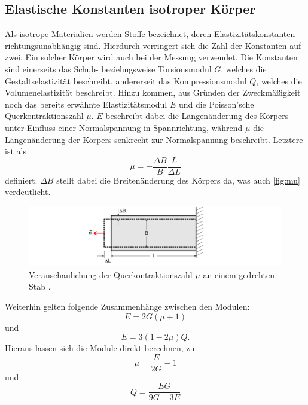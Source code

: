     \subsection{Elastische Konstanten isotroper Körper}
    \label{sec:konstanten}
    Als isotrope Materialien werden Stoffe bezeichnet, deren Elastizitätskonstanten richtungsunabhängig sind. Hierdurch verringert
    sich die Zahl der Konstanten auf zwei. Ein solcher Körper wird auch bei der Messung verwendet.
    Die Konstanten sind einerseits das Schub- beziehugsweise Torsionsmodul $G$, welches die Gestaltselastizität beschreibt, 
    andererseit das Kompressionsmodul $Q$, welches die Volumenelastizität beschreibt. Hinzu kommen, aus Gründen der Zweckmäßigkeit
    noch das bereits erwähnte Elastizitätsmodul $E$ und die Poisson'sche Querkontraktionszahl $\mu$.
    $E$ beschreibt dabei die Längenänderung des Körpers unter Einfluss einer Normalspannung in Spannrichtung, während $\mu$ 
    die Längenänderung der Körpers senkrecht zur Normalspannung beschreibt. Letztere ist als 
    \begin{equation}
    \label{eqn:mu}
    \mu = - \frac{\Delta B}{B} \frac {L}{\Delta L}
    \end{equation}
    definiert. $\Delta B$ stellt dabei die Breitenänderung des Körpers da, was auch \autoref{fig:mu} verdeutlicht.
    \begin{figure}
        \centering
        \includegraphics[width=\textwidth]{content/mu.png}
        \caption{Veranschaulichung der Querkontraktionszahl $\mu$ an einem gedrehten Stab \cite[94]{V102}.}
        \label{fig:mu}
    \end{figure}
    Weiterhin gelten folgende Zusammenhänge zwischen den Modulen:
    \begin{equation}
    \label{eqn:Zusammenhang1}
    E = 2 G (\mu + 1)
    \end{equation}
    und
    \begin{equation}
    \label{eqn:Zusammenhang2}
    E = 3 (1- 2 \mu) Q.
    \end{equation}
    Hieraus lassen sich die Module direkt berechnen, zu
    \begin{equation}
    \label{eqn:mubestimmen}
    \mu = \frac{E}{2G} -1
    \end{equation}
    und 
    \begin{equation}
    \label{eqn:Qbestimmen}
    Q = \frac{EG}{9G - 3E}
    \end{equation}
